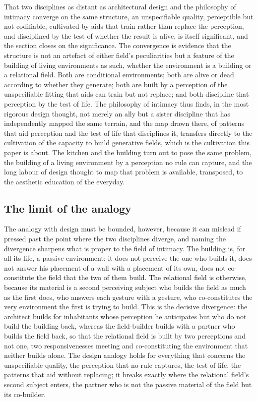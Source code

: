 That two disciplines as distant as architectural design and the philosophy of intimacy converge on the same structure, an unspecifiable quality, perceptible but not codifiable, cultivated by aids that train rather than replace the perception, and disciplined by the test of whether the result is alive, is itself significant, and the section closes on the significance. The convergence is evidence that the structure is not an artefact of either field's peculiarities but a feature of the building of living environments as such, whether the environment is a building or a relational field. Both are conditional environments; both are alive or dead according to whether they generate; both are built by a perception of the unspecifiable fitting that aids can train but not replace; and both discipline that perception by the test of life. The philosophy of intimacy thus finds, in the most rigorous design thought, not merely an ally but a sister discipline that has independently mapped the same terrain, and the map drawn there, of patterns that aid perception and the test of life that disciplines it, transfers directly to the cultivation of the capacity to build generative fields, which is the cultivation this paper is about. The kitchen and the building turn out to pose the same problem, the building of a living environment by a perception no rule can capture, and the long labour of design thought to map that problem is available, transposed, to the aesthetic education of the everyday.

\subsection{The limit of the analogy}
\label{p22:sub:alex-limit}

The analogy with design must be bounded, however, because it can mislead if pressed past the point where the two disciplines diverge, and naming the divergence sharpens what is proper to the field of intimacy. The building is, for all its life, a passive environment; it does not perceive the one who builds it, does not answer his placement of a wall with a placement of its own, does not co-constitute the field that the two of them build. The relational field is otherwise, because its material is a second perceiving subject who builds the field as much as the first does, who answers each gesture with a gesture, who co-constitutes the very environment the first is trying to build. This is the decisive divergence: the architect builds for inhabitants whose perception he anticipates but who do not build the building back, whereas the field-builder builds with a partner who builds the field back, so that the relational field is built by two perceptions and not one, two responsivenesses meeting and co-constituting the environment that neither builds alone. The design analogy holds for everything that concerns the unspecifiable quality, the perception that no rule captures, the test of life, the patterns that aid without replacing; it breaks exactly where the relational field's second subject enters, the partner who is not the passive material of the field but its co-builder.

